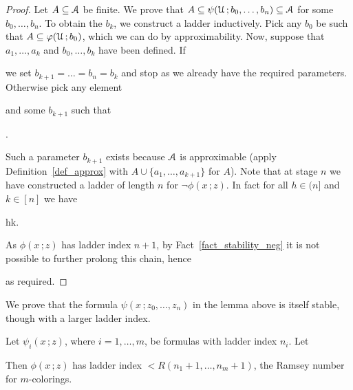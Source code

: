 \documentclass[scombinatorics.tex]{subfiles}
\begin{document}
\begin{proof}
  Let $A\subseteq\EuScript A$ be finite.
  We prove that $A\subseteq\psi(\EuScript U\,;b_0,\dots,b_n)\subseteq\EuScript A$ for some $b_0,\dots,b_n$.
  To obtain the $b_k$, we construct a ladder inductively.
  Pick any $b_0$ be such that $A\subseteq\varphi(\EuScript U\,;b_0)$, which we can do by approximability.
  Now, suppose that $a_1,\dots,a_k$ and $b_0,\dots,b_k$ have been defined.
  If 


  we set $b_{k+1}=\dots=b_n=b_k$ and stop as we already have the required parameters.
  Otherwise pick any element


  and some $b_{k+1}$ such that

  .

  Such a parameter $b_{k+1}$ exists because $\EuScript A$ is approximable (apply Definition~\ref{def_approx} with $A\cup\{a_1,\dots,a_{k+1}\}$ for $A$).
  Note that at stage $n$ we have constructed a ladder of length $n$ for $\neg\phi(x\,;z)$.
  In fact for all $h\in(n]$ and $k\in[n]$ we have
  
  {\IFF}
  {h\le k.}
  
  As $\phi(x\,;z)$ has ladder index $n+1$, by Fact~\ref{fact_stability_neg} it is not possible to further prolong this chain, hence


  as required.
\end{proof}

We prove that the formula $\psi(x\,;z_0,\dots,z_n)$ in the lemma above is itself stable, though with a larger ladder index.
  
\begin{lemma}
  Let $\psi_i(x\,;z)$, where $i=1,\dots,m$, be formulas with ladder index $n_i$. Let
  
  
  Then $\phi(x\,;z)$ has ladder index $< R(n_1+1,\dots, n_m+1)$, the Ramsey number for $m$-colorings.
\end{lemma}
  
\end{document}
